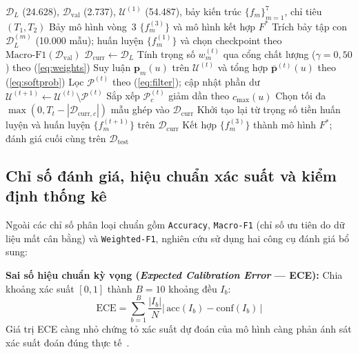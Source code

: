 \documentclass[journal,a4paper]{IEEEtran}
\newcommand{\code}[1]{\texttt{\small #1}}
\begin{document}
\begin{algorithm}[!t]
\caption{Học bán giám sát lặp kết hợp đồng thuận đa mô hình cân bằng lớp}
\label{alg:iepl}
\begin{algorithmic}[1]
\Require $\mathcal{D}_{L}$ (24.628), $\mathcal{D}_{\text{val}}$ (2.737), $\mathcal{U}^{(1)}$ (54.487), bảy kiến trúc $\{f_m\}_{m=1}^7$, chỉ tiêu $(T_1, T_2)$
\Ensure Bảy mô hình vòng~3 $\{f_m^{(3)}\}$ và mô hình kết hợp $F^*$
\State Trích bảy tập con $\mathcal{D}_L^{(m)}$ (10.000 mẫu); huấn luyện $\{f_m^{(1)}\}$ và chọn checkpoint theo $\text{Macro-F1}(\mathcal{D}_{\text{val}})$
\State $\mathcal{D}_{\text{curr}} \leftarrow \mathcal{D}_L$
  \State Tính trọng số $w_m^{(t)}$ qua cổng chất lượng ($\gamma = 0{,}50$) theo (\ref{eq:weights})
  \State Suy luận $\mathbf{p}_m(u)$ trên $\mathcal{U}^{(t)}$ và tổng hợp $\bar{\mathbf{p}}^{(t)}(u)$ theo (\ref{eq:softprob})
  \State Lọc $\mathcal{P}^{(t)}$ theo (\ref{eq:filter}); cập nhật phần dư $\mathcal{U}^{(t+1)} \leftarrow \mathcal{U}^{(t)} \setminus \mathcal{P}^{(t)}$
    \State Sắp xếp $\mathcal{P}_c^{(t)}$ giảm dần theo $c_{\max}(u)$
    \State Chọn tối đa $\max(0, T_t - |\mathcal{D}_{\text{curr}, c}|)$ mẫu ghép vào $\mathcal{D}_{\text{curr}}$
  \EndFor
  \State Khởi tạo lại từ trọng số tiền huấn luyện và huấn luyện $\{f_m^{(t+1)}\}$ trên $\mathcal{D}_{\text{curr}}$
\EndFor
\State Kết hợp $\{f_m^{(3)}\}$ thành mô hình $F^*$; đánh giá cuối cùng trên $\mathcal{D}_{\text{test}}$
\end{algorithmic}
\end{algorithm}

\subsection{Chỉ số đánh giá, hiệu chuẩn xác suất và kiểm định thống kê}
\label{sec:method_metrics}

Ngoài các chỉ số phân loại chuẩn gồm \code{Accuracy}, \code{Macro-F1} (chỉ số ưu tiên do dữ liệu mất cân bằng) và \code{Weighted-F1}, nghiên cứu sử dụng hai công cụ đánh giá bổ sung:

\textbf{Sai số hiệu chuẩn kỳ vọng (\textit{Expected Calibration Error} --- ECE):} Chia khoảng xác suất $[0,1]$ thành $B=10$ khoảng đều $I_b$:
\begin{equation}
  \text{ECE} = \sum_{b=1}^{B} \frac{|I_b|}{N} \left|\,\text{acc}(I_b) - \text{conf}(I_b)\,\right|
  \label{eq:ece}
\end{equation}
Giá trị ECE càng nhỏ chứng tỏ xác suất dự đoán của mô hình càng phản ánh sát xác suất đoán đúng thực tế~\cite{guo2017calibration}.
\end{document}

